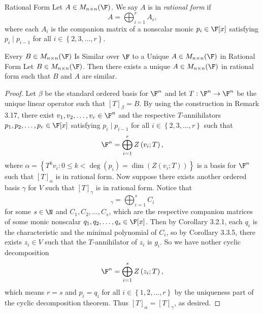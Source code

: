 \documentclass[math_245.tex]{subfiles}
\begin{document}
    \begin{definition}{Rational Form}{}
        Let $A\in M_{n\times n}(\F)$. We say $A$ is in \emph{rational form} if
        \begin{equation*}
            A = \bigoplus^{r}_{i=1} A_i,
        \end{equation*}
        where each $A_i$ is the companion matrix of a nonscalar monic $p_i\in\F[x]$ satisfying $p_i\mid p_{i-1}$ for all $i\in\left\lbrace 2,3,\ldots,r \right\rbrace $.
    \end{definition}

    \begin{theorem}{Every $B\in M_{n\times n}(\F)$ Is Similar over $\F$ to a Unique $A\in M_{n\times n}(\F)$ in Rational Form}
        Let $B\in M_{n\times n}(\F)$. Then there exists a unique $A\in M_{n\times n}(\F)$ in rational form such that $B$ and $A$ are similar.
    \end{theorem}

    \begin{proof}
        Let $\beta$ be the standard ordered basis for $\F^n$ and let $T:\F^n\to\F^n$ be the unique linear operator such that $[T]_\beta = B$. By using the construction in Remark 3.17, there exist $v_1,v_2,\ldots,v_r\in\F^n$ and the respective $T$-annihilators $p_1,p_2,\ldots,p_r\in\F[x]$ satisfying $p_i\mid p_{i-1}$ for all $i\in \left\lbrace 2,3,\ldots,r \right\rbrace$ such that
        \begin{equation*}
            \F^n = \bigoplus^{r}_{i=1} Z\left( v_i;T \right) ,
        \end{equation*}
        where $\alpha = \left\lbrace T^kv_i:0\leq k< \deg\left( p_i \right) = \dim\left( Z\left( v_i;T \right)  \right)  \right\rbrace$ is a basis for $\F^n$ such that $[T]_\alpha$ is in rational form. Now suppose there exists another ordered basis $\gamma$ for $V$ such that $[T]_\gamma$ is in rational form. Notice that
        \begin{equation*}
            [T]_\gamma = \bigoplus^{s}_{i=1} C_i
        \end{equation*}
        for some $s\in\N$ and $C_1,C_2, \ldots, C_s$, which are the respective companion matrices of some monic nonscalar $q_1,q_2,\ldots,q_s\in\F[x]$. Then by Corollary 3.2.1, each $q_i$ is the characteristic and the minimal polynomial of $C_i$, so by Corollary 3.3.5, there exists $z_i\in V$ such that the $T$-annihilator of $z_i$ is $g_i$. So we have nother cyclic decomposition
        \begin{equation*}
            \F^n = \bigoplus^{s}_{i=1} Z\left( z_i;T \right) ,
        \end{equation*}
        which means $r=s$ and $p_i=q_i$ for all $i\in \left\lbrace 1,2,\ldots,r \right\rbrace$ by the uniqueness part of the cyclic decomposition theorem. Thus $[T]_\alpha = [T]_\gamma$, as desired.
    \end{proof}
\end{document}
